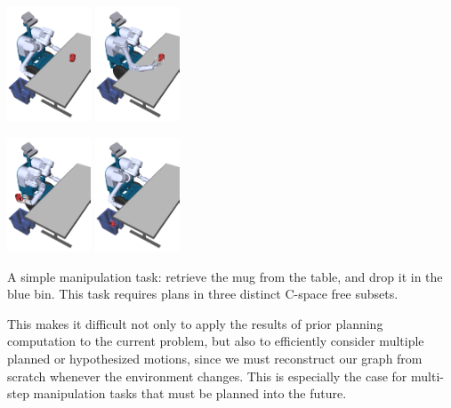 \begin{marginfigure}
   \centering
   \includegraphics[width=2.5cm]{figs/herbbin/step0cropped.png}%
   \includegraphics[width=2.5cm]{figs/herbbin/step01cropped.png}

   \includegraphics[width=2.5cm]{figs/herbbin/step12cropped.png}%
   \includegraphics[width=2.5cm]{figs/herbbin/step2cropped.png}

   \caption{A simple manipulation task: retrieve the mug from
      the table, and drop it in the blue bin.
      This task requires plans in three distinct C-space free subsets.}
   \label{fig:family:herbbin-multistep-example}
\end{marginfigure}

This makes it difficult not only to apply the results of prior
planning computation to the current problem,
but also to efficiently consider multiple planned or hypothesized
motions,
since we must reconstruct our graph from scratch whenever
the environment changes.
This is especially the case for
multi-step manipulation tasks that must be planned into the future.

